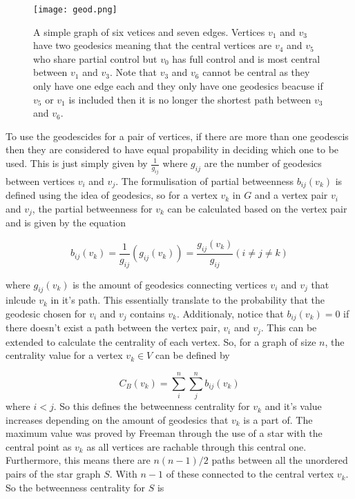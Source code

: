 \begin{figure}[!htb]
	\centering
	\texttt{[image: geod.png]}
	\caption{A simple graph of six vetices and seven edges. Vertices $v_1$ and $v_3$ have two geodesics meaning that the central vertices are $v_4$ and $v_5$ who share partial control but $v_0$ has full control and is most central between $v_1$ and $v_3$. Note that $v_3$ and $v_6$ cannot be central as they only have one edge each and they only have one geodesics beacuse if $v_5$ or $v_1$ is included then it is no longer the shortest path between $v_3$ and $v_6$.}
	\label{fig:geodesics}
\end{figure}

To use the geodescides for a pair of vertices, if there are more than one geodescis then they are considered to have equal propability in deciding which one to be used. This is just simply given by $\frac{1}{g_{ij}}$ where $g_{ij}$ are the number of geodesics between vertices $v_i$ and $v_j$. The formulisation of partial betweenness $b_{ij}(v_k)$ is defined using the idea of geodesics, so for a vertex $v_k$ in $G$ and a vertex pair $v_i$ and $v_j$, the partial betweenness for $v_k$ can be calculated based on the vertex pair and is given by the equation

\begin{equation} \label{eq:gb}
b_{ij}(v_k) = \frac{1}{g_{ij}}(g_{ij}(v_k)) = \frac{g_{ij}(v_k)}{g_{ij}} (i \ne j \ne k)
\end{equation}

where $g_{ij}(v_k)$ is the amount of geodesics connecting vertices $v_i$ and $v_j$ that inlcude $v_k$ in it's path. This essentially translate to the probability that the geodesic chosen for $v_i$ and $v_j$ contains $v_k$. Additionaly, notice that $b_{ij}(v_k) = 0$ if there doesn't exist a path between the vertex pair, $v_i$ and $v_j$.
This can be extended to calculate the centrality of each vertex. So, for a graph of size $n$, the centrality value for a vertex $v_k \in V$ can be defined by

\begin{equation}
C_B(v_k)= \sum_i^n\sum_j^n b_{ij}(v_k)
\end{equation}
where $i < j$. So this defines the betweenness centrality for $v_k$ and it's value increases depending on the amount of geodesics that $v_k$ is a part of. The maximum value\cite{freeman2002centrality} was proved by Freeman through the use of a star with the central point as $v_k$ as all vertices are rachable through this central one. Furthermore, this means there are $n(n-1)/2$ paths between all the unordered pairs of the star graph $S$. With $n-1$ of these connected to the central vertex $v_k$. So the betweenness centrality for $S$ is

